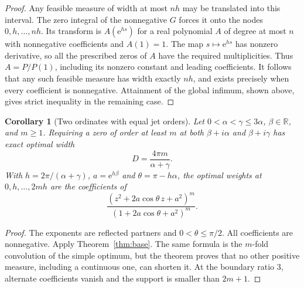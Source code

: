 \documentclass[11pt]{article}
\newtheorem{corollary}[theorem]{Corollary}
\theoremstyle{remark}\newtheorem{remark}[theorem]{Remark}
\newcommand{\R}{\mathbb R}\newcommand{\C}{\mathbb C}\newcommand{\supp}{\operatorname{supp}}
\newcommand{\e}{\mathrm e}\newcommand{\norm}[1]{\left\|#1\right\|}
\begin{document}
\begin{proof}
Any feasible measure of width at most $nh$ may be translated into this interval. The zero integral of the nonnegative $G$ forces it onto the nodes $0,h,\ldots,nh$. Its transform is $A(\e^{hs})$ for a real polynomial $A$ of degree at most $n$ with nonnegative coefficients and $A(1)=1$. The map $s\mapsto\e^{hs}$ has nonzero derivative, so all the prescribed zeros of $A$ have the required multiplicities. Thus $A=P/P(1)$, including its nonzero constant and leading coefficients. It follows that any such feasible measure has width exactly $nh$, and exists precisely when every coefficient is nonnegative. Attainment of the global infimum, shown above, gives strict inequality in the remaining case.
\end{proof}

\begin{corollary}[Two ordinates with equal jet orders]\label{cor:pair}
Let $0<\alpha<\gamma\le3\alpha$, $\beta\in\R$, and $m\ge1$. Requiring a zero of order at least $m$ at both $\beta+i\alpha$ and $\beta+i\gamma$ has exact optimal width
\[
 D=\frac{4\pi m}{\alpha+\gamma}.
\]
With $h=2\pi/(\alpha+\gamma)$, $a=\e^{h\beta}$ and $\theta=\pi-h\alpha$, the optimal weights at $0,h,\ldots,2mh$ are the coefficients of
\[
 \frac{(z^2+2a\cos\theta\,z+a^2)^m}{(1+2a\cos\theta+a^2)^m}.
\]
\end{corollary}
\begin{proof}
The exponents are reflected partners and $0<\theta\le\pi/2$. All coefficients are nonnegative. Apply Theorem~\ref{thm:base}. The same formula is the $m$-fold convolution of the simple optimum, but the theorem proves that no other positive measure, including a continuous one, can shorten it. At the boundary ratio $3$, alternate coefficients vanish and the support is smaller than $2m+1$.
\end{proof}
\end{document}
